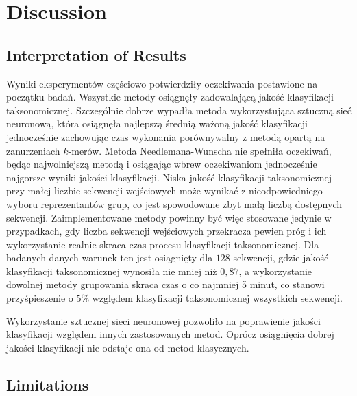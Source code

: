 \documentclass{article}
\newcommand{\temporary}[1]{
    \begin{tcolorbox}[colframe=red, colback=white, title={\textbf{WERSJA PO POLSKU}}, sharp corners=south]
        #1
    \end{tcolorbox}
}
\begin{document}
    \clearpage
    \section{Discussion}

        \subsection{Interpretation of Results}

            \temporary{
                Wyniki eksperymentów częściowo potwierdziły oczekiwania postawione na początku badań. Wszystkie metody osiągnęły zadowalającą jakość klasyfikacji taksonomicznej. Szczególnie dobrze wypadła metoda wykorzystująca sztuczną sieć neuronową, która osiągnęła najlepszą średnią ważoną jakość klasyfikacji jednocześnie zachowując czas wykonania porównywalny z metodą opartą na zanurzeniach $k$-merów. Metoda Needlemana-Wunscha nie spełniła oczekiwań, będąc najwolniejszą metodą i osiągając wbrew oczekiwaniom jednocześnie najgorsze wyniki jakości klasyfikacji. Niska jakość klasyfikacji taksonomicznej przy małej liczbie sekwencji wejściowych może wynikać z nieodpowiedniego wyboru reprezentantów grup, co jest spowodowane zbyt małą liczbą dostępnych sekwencji. Zaimplementowane metody powinny być więc stosowane jedynie w przypadkach, gdy liczba sekwencji wejściowych przekracza pewien próg i ich wykorzystanie realnie skraca czas procesu klasyfikacji taksonomicznej. Dla badanych danych warunek ten jest osiągnięty dla $128$ sekwencji, gdzie jakość klasyfikacji taksonomicznej wynosiła nie mniej niż $0,87$, a wykorzystanie dowolnej metody grupowania skraca czas o co najmniej 5 minut, co stanowi przyśpieszenie o $5\%$ względem klasyfikacji taksonomicznej wszystkich sekwencji.
            }

            \temporary{
                Wykorzystanie sztucznej sieci neuronowej pozwoliło na poprawienie jakości klasyfikacji względem innych zastosowanych metod. Oprócz osiągnięcia dobrej jakości klasyfikacji nie odstaje ona od metod klasycznych.
            }

        \subsection{Limitations}
\end{document}
